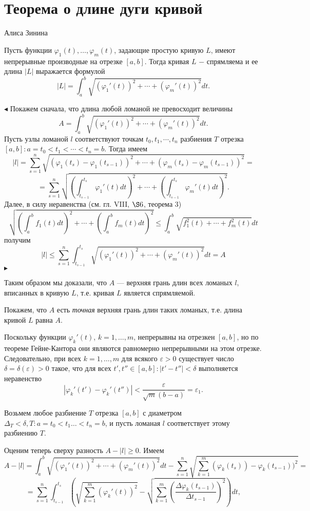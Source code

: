 \chapter{Теорема о длине дуги кривой}
\centerline{Алиса Зинина}
\vskip 5mm
\begin{theorem} Пусть функции $\varphi_1(t),\ldots,\varphi_m(t)$, задающие простую кривую $L$, имеют непрерывные производные на отрезке $[a,b]$. Тогда кривая $L$ $-$ спрямляема и ее длина $|L|$ выражается формулой
\vskip 5mm
$$|L|=\int_a^b{\sqrt{(\varphi_1'(t))^2+\cdots+(\varphi_m'(t))^2}dt}.$$
\end{theorem}
\vskip 5mm
$\blacktriangleleft$ Покажем сначала, что длина любой ломаной не превосходит величины
\vskip 5mm
$$A=\int_a^b\sqrt{(\varphi_1'(t))^2+\cdots+(\varphi_m'(t))^2}dt.$$
\vskip 5mm
Пусть узлы ломаной $l$ соответствуют точкам $t_0,t_1,\cdots,t_n$ разбиения $T$ отрезка $[a,b]:a=t_0<t_1<\cdots<t_n=b. $ Тогда имеем $$|l|=\sum_{s=1}^n\sqrt{(\varphi_1(t_s)-\varphi_1(t_{s-1}))^2+\cdots+(\varphi_m(t_s)-\varphi_m(t_{s-1}))^2}=$$
$$=\sum_{s=1}^n\sqrt{\left(\int_{t_{s-1}}^{t_s}{\varphi_1'(t)dt}\right)^2+\cdots+\left(\int_{t_{s-1}}^{t_s}{\varphi_m'(t)dt}\right)^2}.$$
Далее, в силу неравенства (см. гл. VIII, $\S6$, теорема 3)
$$\sqrt{\left(\int_a^b{f_1(t)dt}\right)^2+\cdots+\left(\int_a^b{f_m(t)dt}\right)^2}\le\int_a^b{\sqrt{f_1^2(t)+\cdots+f_m^2(t)}dt}$$
получим
$$|l|\le\sum_{s=1}^n\int_{t_{s-1}}^{t_s}{\sqrt{(\varphi_1'(t))^2+\cdots+(\varphi_m'(t))^2}dt}=A$$$ 
\blacktriangleright$

Таким образом мы доказали, что $A$ --- верхняя грань длин всех ломаных $l$, вписанных в кривую $L$, т.е. кривая $L$ является спрямляемой.

Покажем, что $A$ есть {\itshape точная} верхняя грань длин таких ломаных, т.е. длина кривой $L$ равна $A$.

Поскольку функции $\varphi_k'(t)$, $k=1,\ldots,m$, непрерывны на отрезкен $[a,b]$, но по теореме Гейне-Кантора они являются равномерно непрерывными на этом отрезке. Следовательно, при всех $k=1,\ldots,m$ для всякого $\varepsilon>0$ существует число $\delta=\delta(\varepsilon)>0$ такое, что для всех $t',t'' \in [a,b]:|t'-t''|<\delta$ выполняется неравенство
$$|\varphi_k'(t')-\varphi_k'(t'')|<\dfrac{\varepsilon}{\sqrt{m}(b-a)}=\varepsilon_1.$$

Возьмем любое разбиение $T$ отрезка $[a,b]$ с диаметром $\Delta_T<\delta, T: a=t_0<t_1\ldots<t_n=b$, и пусть ломаная $l$ соответствует этому разбиению $T$.

Оценим теперь сверху разность $A-|l|\ge0.$ Имеем
$$A-|l|=\int_a^b{\sqrt{(\varphi_1'(t))^2+\cdots+(\varphi_m'(t))^2}dt}-\sum_{s=1}^n\sqrt{\sum_{k=1}^m(\varphi_k(t_s))-\varphi_k(t_{s-1}))^2}=$$
$$=\sum_{s=1}^n\int_{t_{s-1}}^{t_s}{\left(\sqrt{\sum_{k=1}^m(\varphi_k'(t))^2}-\sqrt{\sum_{k=1}^m\left(\dfrac{\Delta\varphi_k(t_{s-1})}{\Delta t_{s-1}}\right)^2}\right)dt},$$

